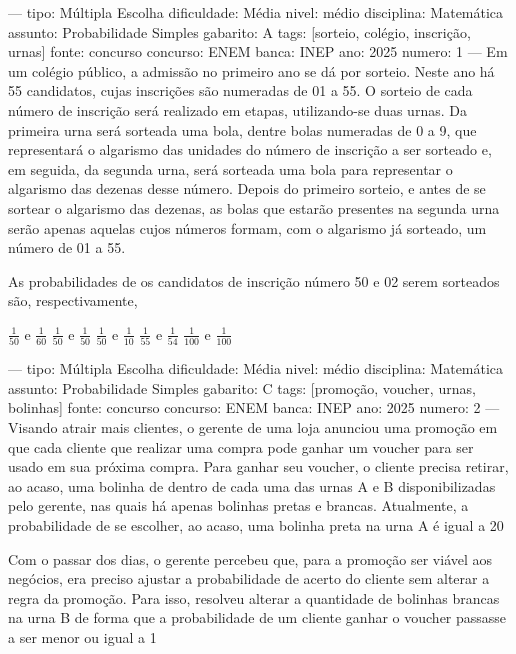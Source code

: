 ---
tipo: Múltipla Escolha
dificuldade: Média
nivel: médio
disciplina: Matemática
assunto: Probabilidade Simples
gabarito: A
tags: [sorteio, colégio, inscrição, urnas]
fonte: concurso
concurso: ENEM
banca: INEP
ano: 2025
numero: 1
---
\question
Em um colégio público, a admissão no primeiro ano se dá por sorteio. Neste ano há 55 candidatos, cujas inscrições são numeradas de 01 a 55. O sorteio de cada número de inscrição será realizado em etapas, utilizando-se duas urnas. Da primeira urna será sorteada uma bola, dentre bolas numeradas de 0 a 9, que representará o algarismo das unidades do número de inscrição a ser sorteado e, em seguida, da segunda urna, será sorteada uma bola para representar o algarismo das dezenas desse número. Depois do primeiro sorteio, e antes de se sortear o algarismo das dezenas, as bolas que estarão presentes na segunda urna serão apenas aquelas cujos números formam, com o algarismo já sorteado, um número de 01 a 55.

As probabilidades de os candidatos de inscrição número 50 e 02 serem sorteados são, respectivamente,
\begin{choices}
\correctchoice \( \frac{1}{50} \) e \( \frac{1}{60} \)
\choice \( \frac{1}{50} \) e \( \frac{1}{50} \)
\choice \( \frac{1}{50} \) e \( \frac{1}{10} \)
\choice \( \frac{1}{55} \) e \( \frac{1}{54} \)
\choice \( \frac{1}{100} \) e \( \frac{1}{100} \)
\end{choices}

---
tipo: Múltipla Escolha
dificuldade: Média
nivel: médio
disciplina: Matemática
assunto: Probabilidade Simples
gabarito: C
tags: [promoção, voucher, urnas, bolinhas]
fonte: concurso
concurso: ENEM
banca: INEP
ano: 2025
numero: 2
---
\question
Visando atrair mais clientes, o gerente de uma loja anunciou uma promoção em que cada cliente que realizar uma compra pode ganhar um voucher para ser usado em sua próxima compra. Para ganhar seu voucher, o cliente precisa retirar, ao acaso, uma bolinha de dentro de cada uma das urnas A e B disponibilizadas pelo gerente, nas quais há apenas bolinhas pretas e brancas. Atualmente, a probabilidade de se escolher, ao acaso, uma bolinha preta na urna A é igual a 20%

Com o passar dos dias, o gerente percebeu que, para a promoção ser viável aos negócios, era preciso ajustar a probabilidade de acerto do cliente sem alterar a regra da promoção. Para isso, resolveu alterar a quantidade de bolinhas brancas na urna B de forma que a probabilidade de um cliente ganhar o voucher passasse a ser menor ou igual a 1%


